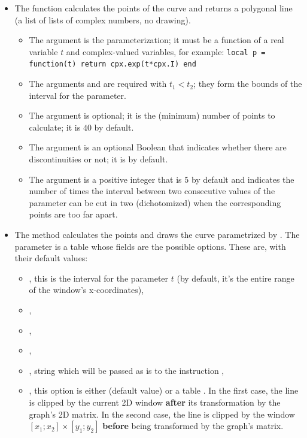 \begin{itemize}
    \item The function  calculates the points of the curve and returns a polygonal line (a list of lists of complex numbers, no drawing).
\begin{itemize}
    \item The argument  is the parameterization; it must be a function of a real variable $t$ and complex-valued variables, for example:
\texttt{local p = function(t) return cpx.exp(t*cpx.I) end}
    \item The arguments  and  are required with \(t_1 < t_2\); they form the bounds of the interval for the parameter.
     \item The argument  is optional; it is the (minimum) number of points to calculate; it is $40$ by default.
    \item The argument  is an optional Boolean that indicates whether there are discontinuities or not; it is \false by default.
    \item The argument  is a positive integer that is $5$ by default and indicates the number of times the interval between two consecutive values ​​of the parameter can be cut in two (dichotomized) when the corresponding points are too far apart.
\end{itemize}

    \item The method  calculates the points and draws the curve parametrized by . The parameter  is a table whose fields are the possible options. These are, with their default values:

\begin{itemize}
    \item {}, this is the interval for the parameter $t$ (by default, it's the entire range of the window's x-coordinates),
    \item {}, 
    \item {},
    \item {},
    \item {}, string which will be passed as is to the instruction \drawcmd,
    \item {}, this option is either \nil (default value) or a table . In the first case, the line is clipped by the current 2D window \textbf{after} its transformation by the graph's 2D matrix. In the second case, the line is clipped by the window $[x_1;x_2]\times[y_1;y_2]$ \textbf{before} being transformed by the graph's matrix.
\end{itemize}
\end{itemize}


